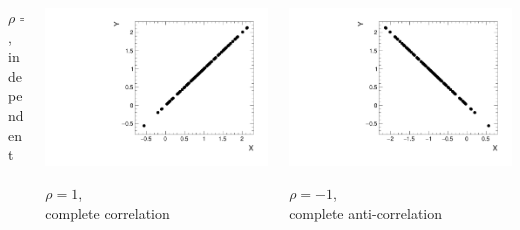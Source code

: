 \documentclass[9pt]{beamer}
\begin{document}
\begin{frame}
{\begin{columns}
\begin{column}{0.27\textwidth}
   \centering
   $\rho=0$,\\ independent
  \end{column}
  \begin{column}{0.27\textwidth}
   \includegraphics[width=\textwidth]{cor}
   
   \centering
   $\rho=1$,\\ complete correlation
  \end{column}
  \begin{column}{0.27\textwidth}
   \includegraphics[width=\textwidth]{anticor}
   
   \centering
   $\rho=-1$,\\ complete anti-correlation
  \end{column}
 \end{columns}
}

\end{frame}
\end{document}
